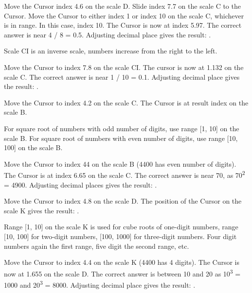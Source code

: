 \begin{multicols*}{3}
{  

Move the Cursor index 4.6 on the scale D.
Slide index 7.7 on the scale C to the Cursor.
Move the Cursor to either index 1 or index 10 on the scale C, whichever is in range. In this case, index 10.
The Cursor is now at index 5.97. The correct answer is near 4 / 8 = 0.5. Adjusting decimal place gives the result: .


\footnotesize Scale CI is an inverse scale, numbers increase from the right to the left. \normalsize

Move the Cursor to index 7.8 on the scale CI.
The cursor is now at 1.132 on the scale C.
The correct answer is near 1 / 10 = 0.1. Adjusting decimal place gives the result: .


Move the Cursor to index 4.2 on the scale C.
The Cursor is at result index  on the scale B.


\footnotesize For square root of numbers with odd number of digits, use range [1, 10] on the scale B. For square root of numbers with even number of digits, use range [10, 100] on the scale B. \normalsize

Move the Cursor to index 44 on the scale B (4400 has even number of digits).
The Cursor is at index 6.65 on the scale C. The correct answer is near 70, as 70\textsuperscript{2} = 4900. Adjusting decimal places gives the result: .


Move the Cursor to index 4.8 on the scale D.
The position of the Cursor on the scale K gives the result: .


\footnotesize Range [1, 10] on the scale K is used for cube roots of one-digit numbers, range [10, 100] for two-digit numbers, [100, 1000] for three-digit numbers. Four digit numbers again the first range, five digit the second range, etc. \normalsize

Move the Cursor to index 4.4 on the scale K (4400 has 4 digits).
The Cursor is now at 1.655 on the scale D.
The correct answer is between 10 and 20 as 10\textsuperscript{3} = 1000 and 20\textsuperscript{3} = 8000. Adjusting decimal place gives the result: .

}
\end{multicols*}
